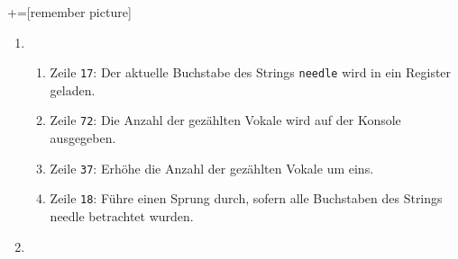 \newcommand{\boxy}[2][yellow]{\mathchoice%
  {\pgfsetfillopacity{0.3}\colorbox{#1}{\pgfsetfillopacity{1}$\displaystyle#2$}}%
  {\pgfsetfillopacity{0.3}\colorbox{#1}{\pgfsetfillopacity{1}$\textstyle#2$}}%
  {\pgfsetfillopacity{0.3}\colorbox{#1}{\pgfsetfillopacity{1}$\scriptstyle#2$}}%
  {\pgfsetfillopacity{0.3}\colorbox{#1}{\pgfsetfillopacity{1}$\scriptscriptstyle#2$}}}%

\let\bnot\xoverline
\let\bnor\downarrow
\newcommand{\xorexpanded}[2]{\bnot{#1}#2 \lor #1\bnot{#2}}
\newcommand{\xor}[0]{\nleftrightarrow}
\newcommand{\linenum}[1]{\textcolor{RedViolet}{\texttt{#1}}}
+=[remember picture]

\begin{enumerate}[label={[OH\arabic*]},start=11]
    \item
        \begin{enumerate}
            \makeatletter
                \setlength{\leftmargins}{\@totalleftmargin}
            \makeatother

            \item 
                \begin{enumerate}
                    \item Zeile \linenum{17}: Der aktuelle Buchstabe des Strings \texttt{needle} wird in ein Register geladen.
                    \item Zeile \linenum{72}: Die Anzahl der gezählten Vokale wird auf der Konsole ausgegeben.
                    \item Zeile \linenum{37}: Erhöhe die Anzahl der gezählten Vokale um eins.
                    \item Zeile \linenum{18}: Führe einen Sprung durch, sofern alle Buchstaben des Strings needle betrachtet wurden.
                \end{enumerate}

            \item \blanko
                { \small \inputminted[linenos,firstnumber=last,autogobble,xleftmargin=-\leftmargins,frame=leftline,framesep=10pt]{mipslexer.py:MIPSLexer -x}{vokale.s} }
        \end{enumerate}
\end{enumerate}